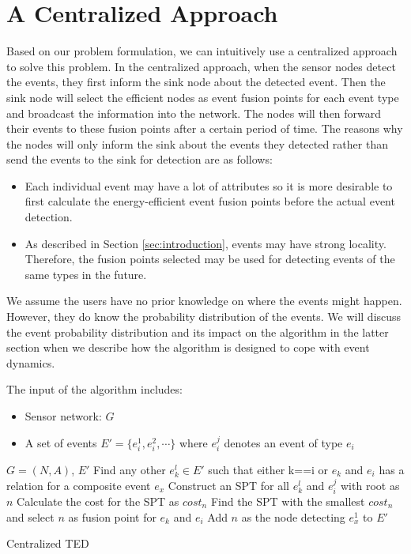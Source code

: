 \section{A Centralized Approach}
\label{sec:centralized}
Based on our problem formulation, we can intuitively use a centralized approach to solve this problem. In the centralized approach, when the sensor nodes detect the events, they first inform the sink node about the detected event. Then the sink node will select the efficient nodes as event fusion points for each event type and broadcast the information into the network. The nodes will then forward their events to these fusion points after a certain period of time. The reasons why the nodes will only inform the sink about the events they detected rather than send the events to the sink for detection are as follows:
\begin{itemize}
\item Each individual event may have a lot of attributes so it is more desirable to first calculate the energy-efficient event fusion points before the actual event detection.
\item As described in Section \ref{sec:introduction}, events may have strong locality. Therefore, the fusion points selected may be used for detecting events of the same types in the future.
\end{itemize}

We assume the users have no prior knowledge on where the events might happen. However, they do know the probability distribution of the events. We will discuss the event probability distribution and its impact on the algorithm in the latter section when we describe how the algorithm is designed to cope with event dynamics.

The input of the algorithm includes:
\begin{itemize}
\item Sensor network: \(G\)
\item A set of events \(E'=\{e_i^1, e_i^2, \cdots \}\) where \(e_i^j\) denotes an event of type \(e_i\)
\end{itemize}

\begin{algorithm}
\begin{algorithmic}[1]
\REQUIRE \(G=(N,A)\), \(E'\)
			\STATE Find any other \(e_k^l\in E'\) such that either k==i or \(e_k\) and \(e_i\) has a relation for a composite event \(e_x\)
				\STATE Construct an SPT for all \(e_k^l\) and \(e_i^j\) with root as \(n\)
				\STATE Calculate the cost for the SPT as \(cost_n\)
			\ENDFOR
			\STATE Find the SPT with the smallest \(cost_n\) and select \(n\) as fusion point for \(e_k\) and \(e_i\)
			\STATE Add \(n\) as the node detecting \(e_x^1\) to \(E'\)
		\ENDIF
	\ENDFOR
\end{algorithmic}
\caption{Centralized TED}
\label{algo:centralizedTED}
\end{algorithm}

